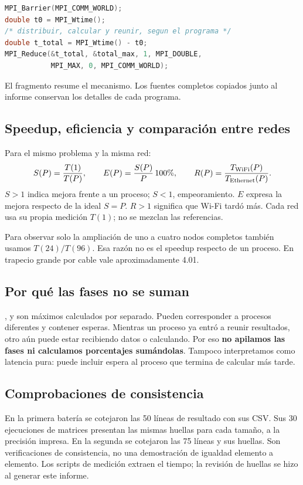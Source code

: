 \begin{lstlisting}[language=C]
MPI_Barrier(MPI_COMM_WORLD);
double t0 = MPI_Wtime();
/* distribuir, calcular y reunir, segun el programa */
double t_total = MPI_Wtime() - t0;
MPI_Reduce(&t_total, &total_max, 1, MPI_DOUBLE,
           MPI_MAX, 0, MPI_COMM_WORLD);
\end{lstlisting}
El fragmento resume el mecanismo. Los fuentes completos copiados junto al informe conservan los detalles de cada programa.

\subsection{Speedup, eficiencia y comparación entre redes}
Para el mismo problema y la misma red:
\[
 S(P)=\frac{T(1)}{T(P)},\qquad
 E(P)=\frac{S(P)}{P}\,100\%,\qquad
 R(P)=\frac{T_{\rm WiFi}(P)}{T_{\rm Ethernet}(P)}.
\]
$S>1$ indica mejora frente a un proceso; $S<1$, empeoramiento. $E$ expresa la mejora respecto de la ideal $S=P$. $R>1$ significa que Wi-Fi tardó más. Cada red usa su propia medición $T(1)$; no se mezclan las referencias.

Para observar solo la ampliación de uno a cuatro nodos completos también usamos $T(24)/T(96)$. Esa razón no es el speedup respecto de un proceso. En trapecio grande por cable vale aproximadamente 4.01.

\subsection{Por qué las fases no se suman}
,  y  son máximos calculados por separado. Pueden corresponder a procesos diferentes y contener esperas. Mientras un proceso ya entró a reunir resultados, otro aún puede estar recibiendo datos o calculando. Por eso \textbf{no apilamos las fases ni calculamos porcentajes sumándolas}. Tampoco interpretamos  como latencia pura: puede incluir espera al proceso que termina de calcular más tarde.

\subsection{Comprobaciones de consistencia}
En la primera batería se cotejaron las 50 líneas de resultado con sus CSV. Sus 30 ejecuciones de matrices presentan las mismas huellas para cada tamaño, a la precisión impresa. En la segunda se cotejaron las 75 líneas y sus huellas. Son verificaciones de consistencia, no una demostración de igualdad elemento a elemento. Los scripts de medición extraen el tiempo; la revisión de huellas se hizo al generar este informe.

